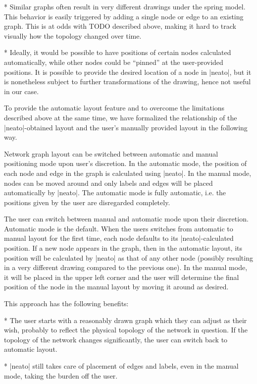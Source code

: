 * Similar graphs often result in very different drawings under the spring
model. This behavior is easily triggered by adding a single node or edge to an
existing graph. This is at odds with TODO described above, making it hard to
track visually how the topology changed over time.

* Ideally, it would be possible to have positions of certain nodes calculated
automatically, while other nodes could be ``pinned'' at the user-provided
positions. It is possible to provide the desired location of a node in |neato|,
but it is nonetheless subject to further transformations of the drawing, hence
not useful in our case.

\enditems

To provide the automatic layout feature and to overcome the limitations
described above at the same time, we have formalized the relationship of the
|neato|-obtained layout and the user's manually provided layout in the following
way.

Network graph layout can be switched between automatic and manual positioning
mode upon user's discretion. In the automatic mode, the position of each node
and edge in the graph is calculated using |neato|. In the manual mode, nodes
can be moved around and only labels and edges will be placed automatically by
|neato|. The automatic mode is fully automatic, i.e. the positions given by the
user are disregarded completely.

The user can switch between manual and automatic mode upon their discretion.
Automatic mode is the default. When the users switches from automatic to manual
layout for the first time, each node defaults to its |neato|-calculated
position.  If a new node appears in the graph, then in the automatic layout, its
position will be calculated by |neato| as that of any other node (possibly
resulting in a very different drawing compared to the previous one). In the
manual mode, it will be placed in the upper left corner and the user will
determine the final position of the node in the manual layout by moving it
around as desired.

This approach has the following benefits:

\begitems

* The user starts with a reasonably drawn graph which they can adjust as their
wish, probably to reflect the physical topology of the network in question.  If
the topology of the network changes significantly, the user can switch back to
automatic layout.

* |neato| still takes care of placement of edges and labels, even in the manual
mode, taking the burden off the user.

